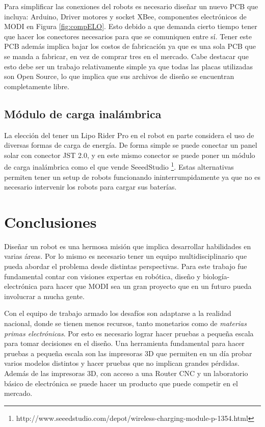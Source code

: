 Para simplificar las conexiones del robots es necesario diseñar un nuevo PCB que incluya: Arduino, Driver motores y socket XBee, componentes electrónicos de MODI en Figura \ref{fig:compELO}. Esto debido a que demanda cierto tiempo tener que hacer los conectores necesarios para que se comuniquen entre sí. Tener este PCB además implica bajar los costos de fabricación ya que es una sola PCB que se manda a fabricar, en vez de comprar tres en el mercado. Cabe destacar que esto debe ser un trabajo relativamente simple ya que todas las placas utilizadas son Open Source, lo que implica que sus archivos de diseño se encuentran completamente libre.



\subsection{Módulo de carga inalámbrica}
La elección del tener un Lipo Rider Pro en el robot en parte considera el uso de diversas formas de carga de energía. De forma simple se puede conectar un panel solar con conector JST 2.0, y en este mismo conector se puede poner un módulo de carga inalámbrica como el que vende SeeedStudio \footnote{http://www.seeedstudio.com/depot/wireless-charging-module-p-1354.html}. Estas alternativas permiten tener un setup de robots funcionando ininterrumpidamente ya que no es necesario intervenir los robots para cargar sus baterías. 



\section{Conclusiones}
Diseñar un robot es una hermosa misión que implica desarrollar habilidades en varias áreas. Por lo mismo es necesario tener un equipo multidisciplinario que pueda abordar el problema desde distintas perspectivas. Para este trabajo fue fundamental contar con visiones expertas en robótica, diseño y biología-electrónica para hacer que MODI sea un gran proyecto que en un futuro pueda involucrar a mucha gente.

Con el equipo de trabajo armado los desafíos son adaptarse a la realidad nacional, donde se tienen menos recursos, tanto monetarios como de \textit{materias primas electrónicas}. Por esto es necesario lograr  hacer pruebas a pequeña escala para tomar decisiones en el diseño. Una herramienta fundamental para hacer pruebas a pequeña escala son las impresoras 3D que permiten en un día probar varios modelos distintos y hacer pruebas que no implican grandes pérdidas. Además de las impresoras 3D, con acceso a una Router CNC y un laboratorio básico de electrónica se puede hacer un producto que puede competir en el mercado.

